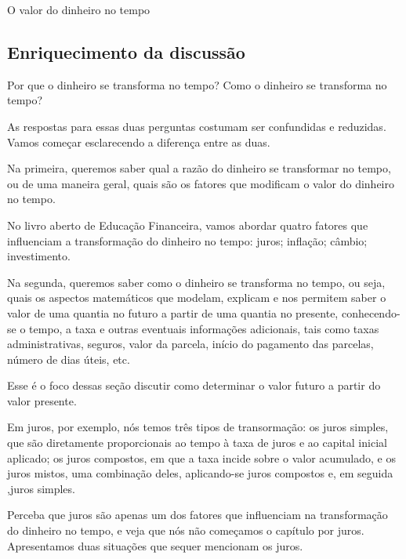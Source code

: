 \begin{paginatexto}{O valor do dinheiro no tempo}
\subsection*{Enriquecimento da discussão}

Por que o dinheiro se transforma no tempo? Como o dinheiro se transforma no tempo? 

As respostas para essas duas perguntas costumam ser confundidas e reduzidas. Vamos começar esclarecendo a diferença entre as duas.

Na primeira, queremos saber qual a razão do dinheiro se transformar no tempo, ou de uma maneira geral, quais são os fatores que modificam o valor do dinheiro no tempo.

No livro aberto de Educação Financeira, vamos abordar quatro fatores que influenciam a transformação do dinheiro no tempo: juros; inflação; câmbio; investimento.

Na segunda, queremos saber como o dinheiro se transforma no tempo, ou seja, quais os aspectos matemáticos que modelam, explicam e nos permitem saber o valor de uma quantia no futuro a partir de uma quantia no presente, conhecendo-se o tempo, a taxa e outras eventuais informações adicionais, tais como taxas administrativas, seguros, valor da parcela, início do pagamento das parcelas, número de dias úteis, etc.

Esse é o foco dessas seção discutir como determinar o valor futuro a partir do valor presente.

Em juros, por exemplo, nós temos três tipos de transormação: os juros simples, que são diretamente proporcionais ao tempo à taxa de juros e ao capital inicial aplicado; os juros compostos, em que a taxa incide sobre o valor acumulado, e os juros mistos, uma combinação deles, aplicando-se juros compostos e, em seguida ,juros simples.

Perceba que juros são apenas um dos fatores que influenciam na transformação do dinheiro no tempo, e veja que nós não começamos o capítulo por juros. Apresentamos duas situações que sequer mencionam os juros.
\end{paginatexto}


